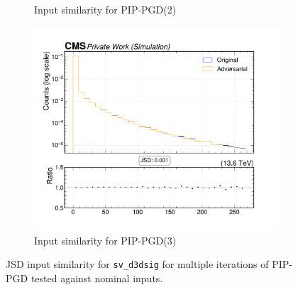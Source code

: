\begin{figure}[htbp]
\begin{subfigure}[t]{0.32\textwidth}
    \caption*{Input similarity for PIP-PGD(2)}
  \end{subfigure}\hfill
  \begin{subfigure}[t]{0.32\textwidth}
    \includegraphics[width=\linewidth]{media/output/features/compare/combined_it_3/cmp_vtx_arr_sv_d3dsig.pdf}
    \caption*{Input similarity for PIP-PGD(3)}
  \end{subfigure}

  \caption*{JSD input similarity for \texttt{sv\_d3dsig} for multiple iterations of PIP-PGD tested against nominal inputs.}
  \label{fig:combined_input_sv_d3dsig}
\end{figure}


